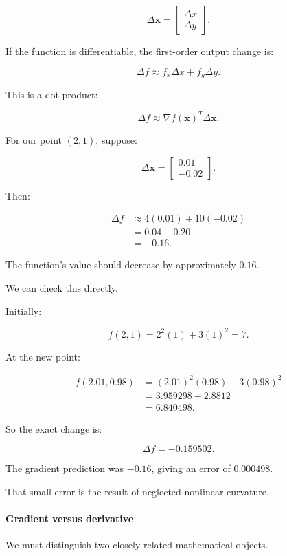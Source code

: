 \[
\Delta\mathbf x= \begin{bmatrix} \Delta x\\ \Delta y \end{bmatrix}.
\]

If the function is differentiable, the first-order output change is:

\[
\Delta f \approx f_x\Delta x+f_y\Delta y.
\]

This is a dot product:

\[
\boxed{ \Delta f\approx\nabla f(\mathbf x)^T\Delta\mathbf x }.
\]

For our point \((2,1)\), suppose:

\[
\Delta\mathbf x= \begin{bmatrix} 0.01\\ -0.02 \end{bmatrix}.
\]

Then:

\[
\begin{aligned} \Delta f &\approx4(0.01)+10(-0.02)\\ &=0.04-0.20\\ &=-0.16. \end{aligned}
\]

The function's value should decrease by approximately \(0.16\).

We can check this directly.

Initially:

\[
f(2,1)=2^2(1)+3(1)^2=7.
\]

At the new point:

\[
\begin{aligned} f(2.01,0.98) &=(2.01)^2(0.98)+3(0.98)^2\\ &=3.959298+2.8812\\ &=6.840498. \end{aligned}
\]

So the exact change is:

\[
\Delta f=-0.159502.
\]

The gradient prediction was \(-0.16\), giving an error of \(0.000498\).

That small error is the result of neglected nonlinear curvature.

\paragraph{Gradient versus derivative}\label{02-foundations-ii-ch021-gradient-versus-derivative}

We must distinguish two closely related mathematical objects.

